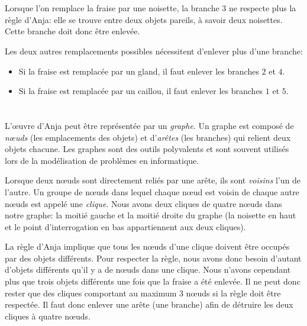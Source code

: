 {{%
\section*{\BrochureSolution}
Lorsque l’on remplace la fraise par une noisette, la branche $3$ ne respecte plus la règle d’Anja: elle se trouve entre deux objets pareils, à savoir deux noisettes. Cette branche doit donc être enlevée.

{\centering%
\par}

Les deux autres remplacements possibles nécessitent d’enlever plus d’une branche:

\begin{itemize}
  \item Si la fraise est remplacée par un gland, il faut enlever les branches $2$ et $4$.
  \item Si la fraise est remplacée par un caillou, il faut enlever les branches $1$ et $5$.
\end{itemize}

{\centering%
\par}



\section*{\BrochureItsInformatics}
L’œuvre d’Anja peut être représentée par un \emph{graphe}. Un graphe est composé de \emph{nœuds} (les emplacements des objets) et d’\emph{arêtes} (les branches) qui relient deux objets chacune. Les graphes sont des outils polyvalents et sont souvent utilisés lors de la modélisation de problèmes en informatique.

Lorsque deux nœuds sont directement reliés par une arête, ils sont \emph{voisins} l’un de l’autre. Un groupe de nœuds dans lequel chaque nœud est voisin de chaque autre nœuds est appelé une \emph{clique}. Nous avons deux cliques de quatre nœuds dans notre graphe: la moitié gauche et la moitié droite du graphe (la noisette en haut et le point d’interrogation en bas appartiennent aux deux cliques).

La règle d’Anja implique que tous les nœuds d’une clique doivent être occupés par des objets différents. Pour respecter la règle, nous avons donc besoin d’autant d’objets différents qu’il y a de nœuds dans une clique. Nous n’avons cependant plus que trois objets différents une fois que la fraise a été enlevée. Il ne peut donc rester que des cliques comportant au maximum $3$ nœuds si la règle doit être respectée. Il faut donc enlever une arête (une branche) afin de détruire les deux cliques à quatre nœuds.

}}
